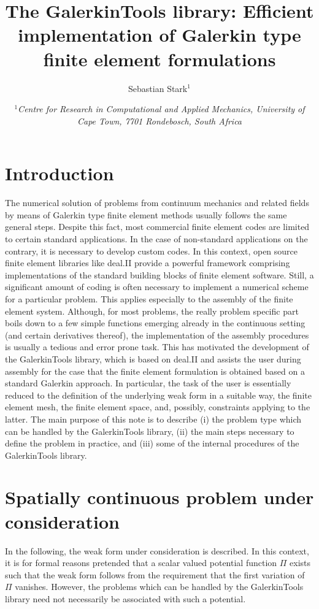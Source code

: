 \documentclass[pdftex,a4paper,12pt,abstracton]{scrartcl}
\title{The GalerkinTools library: Efficient implementation of Galerkin type finite element formulations}
\author{\large Sebastian Stark$^1$}
\date{\footnotesize \textit{$^1$Centre for Research in Computational and Applied Mechanics, University of Cape Town, 7701 Rondebosch, South Africa}}
\begin{document}
\maketitle

\section{Introduction}
The numerical solution of problems from continuum mechanics and related fields by means of Galerkin type finite element methods usually follows the same general steps. Despite this fact, most commercial finite element codes are limited to certain standard applications. In the case of non-standard applications on the contrary, it is necessary to develop custom codes. In this context, open source finite element libraries like deal.II \citep{bangerth2007, alzetta2018} provide a powerful framework comprising implementations of the standard building blocks of finite element software. Still, a significant amount of coding is often necessary to implement a numerical scheme for a particular problem. This applies especially to the assembly of the finite element system. Although, for most problems, the really problem specific part boils down to a few simple functions emerging already in the continuous setting (and certain derivatives thereof), the implementation of the assembly procedures is usually a tedious and error prone task. This has motivated the development of the GalerkinTools library, which is based on deal.II and assists the user during assembly for the case that the finite element formulation is obtained based on a standard Galerkin approach. In particular, the task of the user is essentially reduced to the definition of the underlying weak form in a suitable way, the finite element mesh, the finite element space, and, possibly, constraints applying to the latter. The main purpose of this note is to describe (i) the problem type which can be handled by the GalerkinTools library, (ii) the main steps necessary to define the problem in practice, and (iii) some of the internal procedures of the GalerkinTools library.

\section{Spatially continuous problem under consideration}
In the following, the weak form under consideration is described. In this context, it is for formal reasons pretended that a scalar valued potential function $\Pi$ exists such that the weak form follows from the requirement that the first variation of $\Pi$ vanishes. However, the problems which can be handled by the GalerkinTools library need not necessarily be associated with such a potential.
\end{document}
